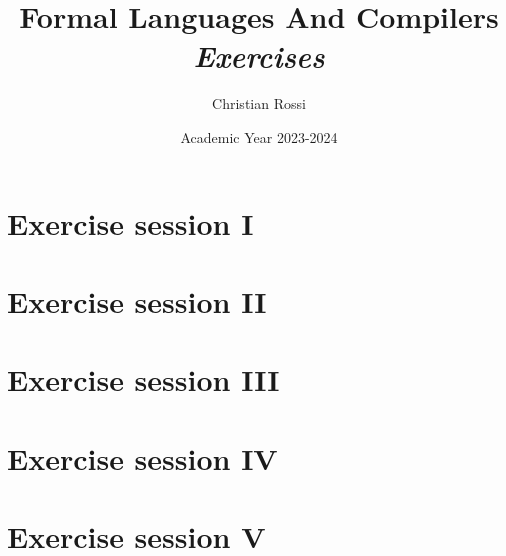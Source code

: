\documentclass[12pt, a4paper]{report}
\title{Formal Languages And Compilers \\ \textit{Exercises}}
\author{Christian Rossi}
\date{Academic Year 2023-2024}
\begin{document}
    \maketitle

    

    \cleardoublepage

    \tableofcontents

    \cleardoublepage

    \chapter{Exercise session I}
    
    
    

    \chapter{Exercise session II}
    
    

    \chapter{Exercise session III}
    
    
    
    \chapter{Exercise session IV}
    
    

    \chapter{Exercise session V}
    
\end{document}
